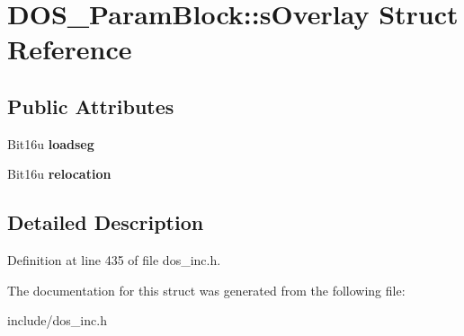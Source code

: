 \hypertarget{structDOS__ParamBlock_1_1sOverlay}{\section{D\-O\-S\-\_\-\-Param\-Block\-:\-:s\-Overlay Struct Reference}
\label{structDOS__ParamBlock_1_1sOverlay}
}
\subsection*{Public Attributes}
\begin{DoxyCompactItemize}
\item 
\hypertarget{structDOS__ParamBlock_1_1sOverlay_a6aa3b07fbae37d952b116773e87712cc}{Bit16u {\bfseries loadseg}}\label{structDOS__ParamBlock_1_1sOverlay_a6aa3b07fbae37d952b116773e87712cc}

\item 
\hypertarget{structDOS__ParamBlock_1_1sOverlay_a1fec335c736328ce8eb8096a2df9ccc6}{Bit16u {\bfseries relocation}}\label{structDOS__ParamBlock_1_1sOverlay_a1fec335c736328ce8eb8096a2df9ccc6}

\end{DoxyCompactItemize}


\subsection{Detailed Description}


Definition at line 435 of file dos\-\_\-inc.\-h.



The documentation for this struct was generated from the following file\-:\begin{DoxyCompactItemize}
\item 
include/dos\-\_\-inc.\-h\end{DoxyCompactItemize}
